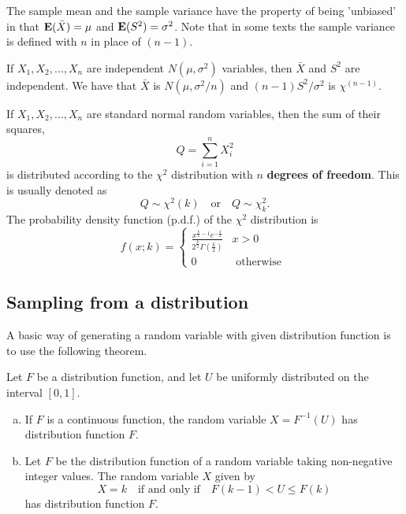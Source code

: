 \begin{remark}
The sample mean and the sample variance have the property of being 'unbiased' in that $\mathbf{E}(\bar{X}) = \mu$ and $\mathbf{E}(S^2) = \sigma^2$. Note that in some texts the sample variance is defined with $n$ in place of $(n - 1)$. 
\end{remark}

\begin{theorem}
If $X_1, X_2, \dots , X_n$ are independent $N(\mu, \sigma^2)$ variables, then $\bar{X}$ and $S^2$ are independent. We have that $\bar{X}$ is $N(\mu, \sigma^2/n)$ and $(n-1)S^2 / \sigma^2$ is $\chi^{(n-1)}$.
\end{theorem}

\begin{definition}
If $X_1, X_2, \dots , X_n$ are standard normal random variables, then the sum of their squares,
\begin{equation*}
    Q = \sum_{i=1}^n X_i^2
\end{equation*}
is distributed according to the $\chi^2$ distribution with $n$ \textbf{degrees of freedom}. This is usually denoted as
\begin{equation*}
    Q \sim \chi^2(k) \quad \text{or} \quad Q \sim \chi^2_k.
\end{equation*}
The probability density function (p.d.f.) of the $\chi^2$ distribution is
\begin{equation*}
    f(x ; k)=\left\{\begin{array}{ll}
    {\frac{x^{\frac{k}{2}-1} e^{-\frac{x}{2}}}{2^{\frac{k}{2}} \Gamma\left(\frac{k}{2}\right)}} & {x>0} \\ 
    {0} & {\text { otherwise }}\end{array}\right.
\end{equation*}
\end{definition}


\subsection{Sampling from a distribution}
A basic way of generating a random variable with given distribution function is to use the following theorem. 
\begin{theorem}
Let $F$ be a distribution function, and let $U$ be uniformly distributed on the interval $[0, 1]$. 
\begin{enumerate}[(a)]
    \item If $F$ is a continuous function, the random variable $X = F^{-1} (U)$ has distribution function $F$.
    \item Let $F$ be the distribution function of a random variable taking non-negative integer values. The random variable $X$ given by 
    \begin{equation*}
        X = k \quad \text{if and only if} \quad F(k-1) < U \leq F(k)
    \end{equation*}
    has distribution function $F$. 
\end{enumerate}
\end{theorem}





